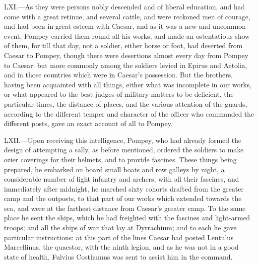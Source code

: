 LXI.—As they were persons nobly descended and of liberal education, and
had come with a great retinue, and several cattle, and were reckoned men
of courage, and had been in great esteem with Caesar, and as it was a
new and uncommon event, Pompey carried them round all his works, and
made an ostentatious show of them, for till that day, not a soldier,
either horse or foot, had deserted from Caesar to Pompey, though there
were desertions almost every day from Pompey to Caesar: but more
commonly among the soldiers levied in Epirus and Aetolia, and in those
countries which were in Caesar's possession. But the brothers, having
been acquainted with all things, either what was incomplete in our
works, or what appeared to the best judges of military matters to be
deficient, the particular times, the distance of places, and the various
attention of the guards, according to the different temper and character
of the officer who commanded the different posts, gave an exact account
of all to Pompey.

LXII.—Upon receiving this intelligence, Pompey, who had already formed
the design of attempting a sally, as before mentioned, ordered the
soldiers to make ozier coverings for their helmets, and to provide
fascines. These things being prepared, he embarked on board small boats
and row galleys by night, a considerable number of light infantry and
archers, with all their fascines, and immediately after midnight, he
marched sixty cohorts drafted from the greater camp and the outposts, to
that part of our works which extended towards the sea, and were at the
farthest distance from Caesar's greater camp. To the same place he sent
the ships, which he had freighted with the fascines and light-armed
troops; and all the ships of war that lay at Dyrrachium; and to each he
gave particular instructions: at this part of the lines Caesar had
posted Lentulus Marcellinus, the quaestor, with the ninth legion, and as
he was not in a good state of health, Fulvius Costhumus was sent to
assist him in the command.

